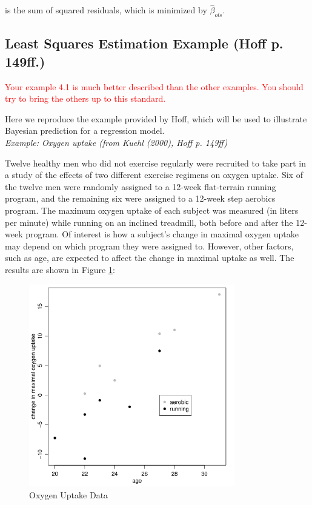 \documentclass[12pt, a4paper]{article}
\begin{document}
\noindent is the sum of squared residuals, which is minimized by $\hat\beta_{ols}$.\\


\subsection{Least Squares Estimation Example (Hoff p. 149ff.)}

\textcolor{red}{Your example 4.1 is much better described than the other examples. You
should try to bring the others up to this standard.}

\noindent Here we reproduce the example provided by Hoff, which will be used to illustrate Bayesian prediction for a regression model.\\

\noindent\textit{Example:  Oxygen uptake (from Kuehl (2000), Hoff p. 149ff)}

\noindent Twelve healthy men who did not exercise regularly were recruited to take part in a study of the effects of two different exercise regimens on oxygen uptake.  Six of the twelve men were randomly assigned to a 12-week flat-terrain running program, and the remaining six were assigned to a 12-week step aerobics program.  The maximum oxygen uptake of each subject was measured (in liters per minute) while running on an inclined treadmill, both before and after the 12-week program.  Of interest is how a subject's change in maximal oxygen uptake may depend on which program they were assigned to.  However, other factors, such as age, are expected to affect the change in maximal uptake as well.  The results are shown in Figure \ref{fig:OxygenData}:

\begin{figure}[ht]
  \centering
  \includegraphics[width=0.8\textwidth]{./Graphics/ExamplePlots/OxygenUptakeData}
  \caption{Oxygen Uptake Data}
  \label{fig:OxygenData}
\end{figure}
\end{document}
